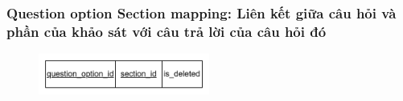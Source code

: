 \subsubsection{Question option Section mapping: Liên kết giữa câu hỏi và phần của khảo sát với câu trả lời của câu hỏi đó}
\begin{center}
        \begin{table}[H]
                \def\arraystretch{2}%
                \caption{Thực thể Question option Section mapping}
        \end{table}
\end{center}
\begin{figure}[H]
        \centering
        \includegraphics[width=0.5\textwidth]{Content/Phân tích và thiết kế hệ thống/images/ERD_mapping/question_option_section_mapping.png}
        \label{fig:Thực thể Question option Section mapping}
\end{figure}

